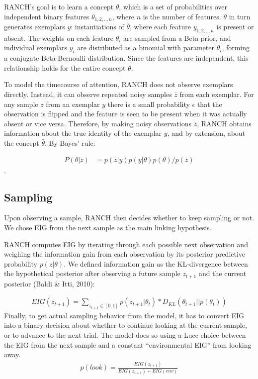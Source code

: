 \documentclass[10pt, letterpaper]{article}
\begin{document}
RANCH's goal is to learn a concept \(\theta\), which is a set of
probabilities over independent binary features \(\theta_{1,2,..,n}\),
where \(n\) is the number of features. \(\theta\) in turn generates
exemplars \(y\): instantiations of \(\bar{\theta}\), where each feature
\(y_{1,2,..,n}\) is present or absent. The weights on each feature
\(\theta_i\) are sampled from a Beta prior, and individual exemplars
\(y_i\) are distributed as a binomial with parameter \(\theta_i\),
forming a conjugate Beta-Bernoulli distribution. Since the features are
independent, this relationship holds for the entire concept \(\theta\).

To model the timecourse of attention, RANCH does not observe exemplars
directly. Instead, it can observe repeated noisy samples \(\bar{z}\)
from each exemplar. For any sample \(z\) from an exemplar \(y\) there is
a small probability \(\epsilon\) that the observation is flipped and the
feature is seen to be present when it was actually absent or vice versa.
Therefore, by making noisy observations \(\bar{z}\), RANCH obtains
information about the true identity of the exemplar \(y\), and by
extension, about the concept \(\bar{\theta}\). By Bayes' rule:

\begin{eqnarray}
P(\theta|\bar{z}) &= p(\bar{z}|y) p(y|\theta) p(\theta) / p(\bar{z})
\end{eqnarray}.

\hypertarget{sampling}{%
\subsection{Sampling}\label{sampling}}

Upon observing a sample, RANCH then decides whether to keep sampling or
not. We chose EIG from the next sample as the main linking hypothesis.

RANCH computes EIG by iterating through each possible next observation
and weighing the information gain from each observation by its posterior
predictive probability \(p(z|\theta)\). We defined information gain as
the KL-divergence between the hypothetical posterior after observing a
future sample \(z_{t+1}\) and the current posterior (Baldi \& Itti,
2010):

\begin{eqnarray}
EIG(z_{t+1}) = \sum_{z_{t+1} \in [0,1]} p(z_{t+1}|\theta_t) * D_{KL}(\theta_{t+1} || p(\theta_t))
\end{eqnarray} Finally, to get actual sampling behavior from the model,
it has to convert EIG into a binary decision about whether to continue
looking at the current sample, or to advance to the next trial. The
model does so using a Luce choice between the EIG from the next sample
and a constant ``environmental EIG'' from looking away. \begin{eqnarray}
p(look) = \frac{EIG(z_{t+1})}{EIG(z_{t+1})+EIG(env)}
\end{eqnarray}
\end{document}
